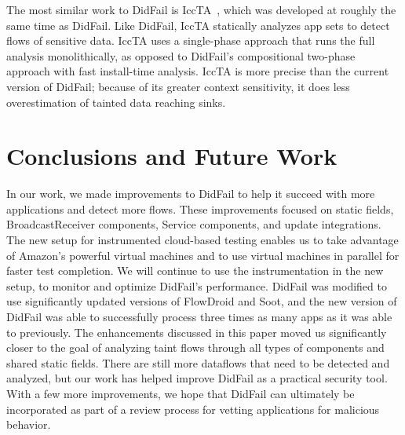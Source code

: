 The most similar work to DidFail is IccTA~\cite{li2015icse}, which was developed at roughly the same time as DidFail.  Like DidFail, IccTA statically analyzes app sets to detect flows of sensitive data. IccTA uses a single-phase approach that runs the full analysis monolithically, as opposed to DidFail's compositional two-phase approach with fast install-time analysis. IccTA is more precise than the current version of DidFail; because of its greater context sensitivity, it does less overestimation of tainted data reaching sinks.

\chapter{Conclusions and Future Work}
In our work, we made improvements to DidFail to help it succeed with more applications and detect more flows. 
These improvements focused on static fields, BroadcastReceiver components, Service components, and update integrations.
 The new setup for instrumented cloud-based testing enables us to take advantage of Amazon's powerful virtual machines and to use virtual machines in parallel for faster test completion. We will continue to use the instrumentation in the new setup, to monitor and optimize DidFail's performance. DidFail was modified to use significantly updated versions of FlowDroid and Soot, and the new version of DidFail was able to successfully process three times as many apps as it was able to previously. The enhancements discussed in this paper moved us significantly closer to the goal of analyzing taint flows through all types of components and shared static fields.
There are still more dataflows that need to be detected and analyzed, but our work has helped improve DidFail as a practical security tool. 
 With a few more improvements, we hope that DidFail can ultimately be incorporated as part of a review process for vetting applications for malicious behavior. 


%




